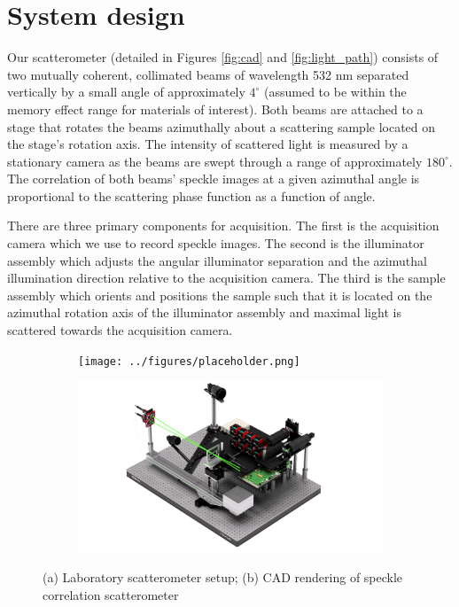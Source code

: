\section{System design}
Our scatterometer (detailed in Figures \ref{fig:cad} and \ref{fig:light_path}) consists of two mutually coherent, collimated beams of wavelength 532 nm separated vertically by a small angle of approximately $4^\circ$ (assumed to be within the memory effect range for materials of interest). Both beams are attached to a stage that rotates the beams azimuthally about a scattering sample located on the stage's rotation axis. The intensity of scattered light is measured by a stationary camera as the beams are swept through a range of approximately $180^\circ$. The correlation of both beams' speckle images at a given azimuthal angle is proportional to the scattering phase function as a function of angle.

There are three primary components for acquisition. The first is the acquisition camera which we use to record speckle images. The second is the illuminator assembly which adjusts the angular illuminator separation and the azimuthal illumination direction relative to the acquisition camera. The third is the sample assembly which orients and positions the sample such that it is located on the azimuthal rotation axis of the illuminator assembly and maximal light is scattered towards the acquisition camera.

\begin{figure}
    \centering
    \begin{subfigure}{0.49\textwidth}
        \centering
        \texttt{[image: ../figures/placeholder.png]}
        \caption{}    %
        \label{fig:lab_setup}
    \end{subfigure}
    \begin{subfigure}{0.49\textwidth}
        \centering
        \includegraphics[width=\textwidth]{../figures/scatterometer.png}
        \caption{}
        \label{fig:cad_setup}
    \end{subfigure}
    \caption{(a) Laboratory scatterometer setup; (b) CAD rendering of speckle correlation scatterometer}
    \label{fig:setups_scatterometer}
\end{figure}

